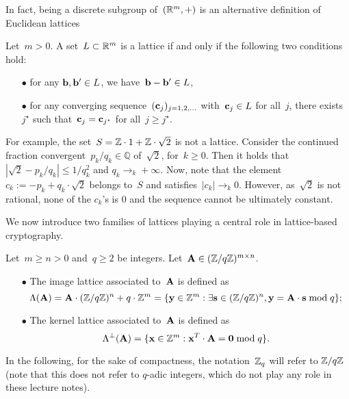 In fact, being a discrete subgroup of~$(\mathbb{R}^m,+)$ is an alternative definition of Euclidean lattices

\begin{lemma}
\label{def:lattice2}
Let~$m >0$. A set~$L \subset \mathbb{R}^m$ is a lattice if and only if the following two conditions hold:
\begin{itemize}
\item[$\bullet$] for any ${\bf b}, {\bf b}' \in L$, we have~${\bf b} - {\bf b}' \in L$,
\item[$\bullet$] for any converging sequence~$({\bf c}_j)_{j=1,2,\ldots}$ with~${\bf c}_j \in L$ for all~$j$, there exists~$j^\star$ such that~${\bf c}_j = {\bf c}_{j^\star}$ for all~$j \geq j^\star$. 
\end{itemize}
\end{lemma}

For example, the set~$S= \mathbb{Z} \cdot 1 + \mathbb{Z} \cdot \sqrt{2}$ is not a lattice. Consider the continued fraction convergent~$p_k/q_k \in \mathbb{Q}$ of~$\sqrt{2}$, for~$k \geq 0$. Then it holds that~$|\sqrt{2} - p_k /q_k| \leq 1/q_k^2$ and $q_k \rightarrow_k +\infty$. Now, note that the element~$c_k := -p_k + q_k \cdot  \sqrt{2}$ belongs to~$S$ and satisfies~$|c_k| \rightarrow_k 0$. However, as~$\sqrt{2}$ is not rational, none of the $c_k$'s is $0$ and the sequence cannot be ultimately constant.

We now introduce two families of lattices playing a central role in lattice-based cryptography.

\begin{definition}
\label{def:qary}
Let~$m \geq n >0$ and~$q \geq 2$ be integers. Let~${\bf A} \in (\mathbb{Z}/q\mathbb{Z})^{m \times n}$. 
\begin{itemize} 
\item[$\bullet$] The image lattice associated to~${\bf A}$ is defined as
\[
\Lambda({\bf A}) = {\bf A} \cdot (\mathbb{Z}/q\mathbb{Z})^n + q \cdot \mathbb{Z}^m = \{ {\bf y} \in \mathbb{Z}^m: \exists {\bf s} \in (\mathbb{Z}/q\mathbb{Z})^n, {\bf y} = {\bf A}\cdot {\bf s} \bmod q\};
\]
\item[$\bullet$] The kernel lattice associated to~${\bf A}$ is defined as
\[
\Lambda^\perp({\bf A}) = \{ {\bf x} \in \mathbb{Z}^m: {\bf x}^T \cdot {\bf A} = {\bf 0} \bmod q\}.
\]
\end{itemize}
\end{definition}

In the following, for the sake of compactness, the notation~$\mathbb{Z}_q$ will refer to $\mathbb{Z}/q\mathbb{Z}$ (note that this does not refer 
to $q$-adic integers, which do not play any role in these lecture notes). 

